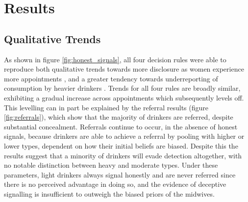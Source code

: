 \section{Results}
\label{sec:results}


\subsection{Qualitative Trends}
\label{sub:qt_results}

As shown in figure \ref{fig:honest_signals}, all four decision rules were able to reproduce both qualitative trends towards more disclosure as women experience more appointments \citep{Phillips2007}, and a greater tendency towards underreporting of consumption by heavier drinkers \citep{Alvik2006}.  Trends for all four rules are broadly similar, exhibiting a gradual increase across appointments which subsequently levels off. This levelling can in part be explained by the referral results (figure \ref{fig:referrals}), which show that the majority of drinkers are referred, despite substantial concealment. Referrals continue to occur, in the absence of honest signals, because drinkers are able to achieve a referral by pooling with higher or lower types, dependent on how their initial beliefs are biased. Despite this the results suggest that a minority of drinkers will evade detection altogether, with no notable distinction between heavy and moderate types. Under these parameters, light drinkers always signal honestly and are never referred since there is no perceived advantage in doing so, and the evidence of deceptive signalling is insufficient to outweigh the biased priors of the midwives. 

